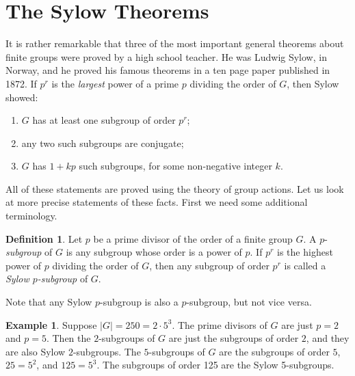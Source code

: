 \documentclass[11pt,oneside]{article}
\theoremstyle{definition}
\newtheorem{defn}[thm]{Definition}
\newtheorem{example}[thm]{Example}
\begin{document}
\setcounter{section}{27}



\section{The Sylow Theorems}\noindent
It is rather remarkable that three of the most important general
theorems about finite groups were proved by a high school teacher. He
was Ludwig Sylow, in Norway, and he proved his famous theorems in a
ten page paper published in 1872. If $p^r$ is the \emph{largest} power
of a prime $p$ dividing the order of $G$, then Sylow showed:
\begin{enumerate}[label=(\roman*)]
\item $G$ has at least one subgroup of order $p^r$;
\item any two such subgroups are conjugate;
\item $G$ has $1+kp$ such subgroups, for some non-negative integer $k$.

\end{enumerate}
All of these statements are proved using the theory of group actions.
Let us look at more precise statements of these facts. First we need
some additional terminology. 


\begin{defn}
Let $p$ be a prime divisor of the order of a finite group $G$.  A
$p$-\emph{subgroup} of $G$ is any subgroup whose order is a power of
$p$.  If $p^r$ is the highest power of $p$ dividing the order of $G$,
then any subgroup of order $p^r$ is called a {\em Sylow $p$-subgroup}
of $G$.
\end{defn}

Note that any Sylow $p$-subgroup is also a $p$-subgroup, but not vice
versa. 

\begin{example}
Suppose $|G| = 250 = 2 \cdot 5^3$. The prime divisors of $G$ are just
$p=2$ and $p=5$. Then the $2$-subgroups of $G$ are just the subgroups
of order $2$, and they are also Sylow $2$-subgroups. The $5$-subgroups
of $G$ are the subgroups of order $5$, $25 = 5^2$, and $125 =
5^3$. The subgroups of order 125 are the Sylow 5-subgroups.
\end{example}
\end{document}
